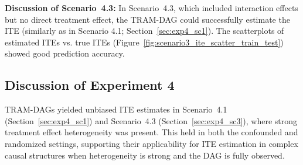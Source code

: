 \FloatBarrier


\textbf{Discussion of Scenario~4.3:} In Scenario~4.3, which included interaction effects but no direct treatment effect, the TRAM-DAG could successfully estimate the ITE (similarly as in Scenario 4.1; Section~\ref{sec:exp4_sc1}). The scatterplots of estimated ITEs vs. true ITEs (Figure~\ref{fig:scenario3_ite_scatter_train_test}) showed good prediction accuracy.














\FloatBarrier

\subsection{Discussion of Experiment 4} \label{sec:disc_experiment4}

TRAM-DAGs yielded unbiased ITE estimates in Scenario~4.1 (Section~\ref{sec:exp4_sc1}) and Scenario~4.3 (Section~\ref{sec:exp4_sc3}), where strong treatment effect heterogeneity was present. This held in both the confounded and randomized settings, supporting their applicability for ITE estimation in complex causal structures when heterogeneity is strong and the DAG is fully observed.

